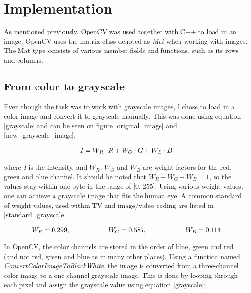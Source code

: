 \chapter{Implementation}
As mentioned previously, OpenCV was used together with C++ to load in an image. OpenCV uses the matrix class denoted as \textit{Mat} when working with images. The Mat type consists of various member fields and functions, such as its rows and columns.

\section{From color to grayscale}
Even though the task was to work with grayscale images, I chose to load in a color image and convert it to grayscale manually. This was done using equation \ref{grayscale} and can be seen on figure \ref{original_image} and \ref{new_grayscale_image}.

\begin{align}
I = W_R \cdot R+W_G \cdot G+W_B \cdot B
\label{grayscale}
\end{align}

where \textit{I} is the intensity, and $W_R$, $W_G$ and $W_B$ are weight factors for the red, green and blue channel. It should be noted that $W_R + W_G + W_B = 1$, so the values stay within one byte in the range of [0, 255]. Using various weight values, one can achieve a grayscale image that fits the human eye. A common standard of weight values, used within TV and image/video coding are listed in \ref{standard_grayscale}. \citep{ip_book}

\begin{align}
W_R = 0.299, \hspace{20 mm} W_G = 0.587, \hspace{20 mm} W_B = 0.114
\label{standard_grayscale}
\end{align}

In OpenCV, the color channels are stored in the order of blue, green and red (and not red, green and blue as in many other places). Using a function named \textit{ConvertColorImageToBlackWhite}, the image is converted from a three-channel color image to a one-channel grayscale image. This is done by looping through each pixel and assign the grayscale value using equation \ref{grayscale}:

